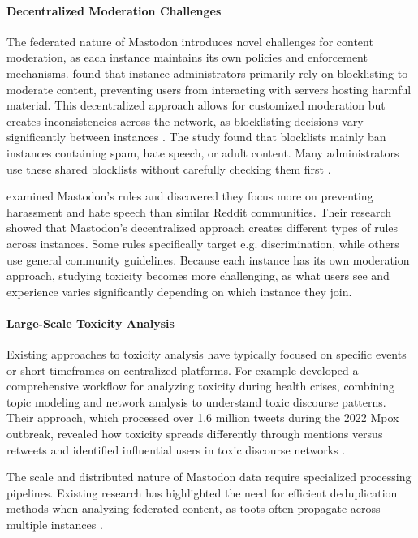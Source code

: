 \paragraph{Decentralized Moderation Challenges}
The federated nature of Mastodon introduces novel challenges for content moderation, as each instance maintains its own policies and enforcement mechanisms. \citet{bono:2024} found that instance administrators primarily rely on blocklisting to moderate content, preventing users from interacting with servers hosting harmful material. This decentralized approach allows for customized moderation but creates inconsistencies across the network, as blocklisting decisions vary significantly between instances \cite{nicholson:2023}. The study found that blocklists mainly ban instances containing spam, hate speech, or adult content. Many administrators use these shared blocklists without carefully checking them first \cite{bono:2024}.

\citet{nicholson:2023} examined Mastodon's rules and discovered they focus more on preventing harassment and hate speech than similar Reddit communities. Their research showed that Mastodon's decentralized approach creates different types of rules across instances. Some rules specifically target e.g. discrimination, while others use general community guidelines. Because each instance has its own moderation approach, studying toxicity becomes more challenging, as what users see and experience varies significantly depending on which instance they join.

\paragraph{Large-Scale Toxicity Analysis}
Existing approaches to toxicity analysis have typically focused on specific events or short timeframes on centralized platforms. For example \citet{fan:2022} developed a comprehensive workflow for analyzing toxicity during health crises, combining topic modeling and network analysis to understand toxic discourse patterns. Their approach, which processed over 1.6 million tweets during the 2022 Mpox outbreak, revealed how toxicity spreads differently through mentions versus retweets and identified influential users in toxic discourse networks \cite{fan:2022}.

The scale and distributed nature of Mastodon data require specialized processing pipelines. Existing research has highlighted the need for efficient deduplication methods when analyzing federated content, as toots often propagate across multiple instances \cite{bono:2024}.